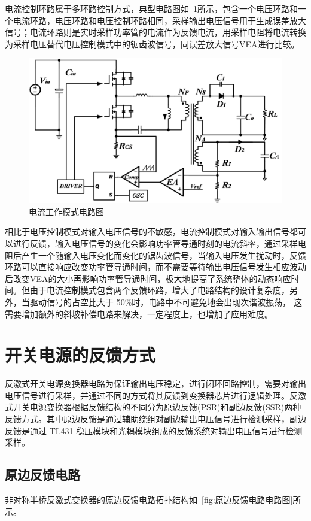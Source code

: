 电流控制环路属于多环路控制方式，典型电路图如~\ref{fig:电流工作模式电路图}所示，包含一个电压环路和一个电流环路，电压环路和电压控制环路相同，采样输出电压信号用于生成误差放大信号；电流环路则是实时采样功率管的电流作为反馈电流，用采样电阻将电流转换为采样电压替代电压控制模式中的锯齿波信号，同误差放大信号VEA进行比较。

\begin{figure}[htbp] 
    \centering
    \includegraphics[width=0.8\linewidth]{figures/电流工作模式电路图.png}
    \caption{电流工作模式电路图}
    \label{fig:电流工作模式电路图}
\end{figure}

相比于电压控制模式对输入电压信号的不敏感，电流控制模式对输入输出信号都可以进行反馈，输入电压信号的变化会影响功率管导通时刻的电流斜率，通过采样电阻后产生一个随输入电压变化而变化的锯齿波信号，当输入电压发生扰动时，反馈环路可以直接响应改变功率管导通时间，而不需要等待输出电压信号发生相应波动后改变VEA的大小再影响功率管导通时间，极大地提高了系统整体的动态响应时间。但由于电流控制模式包含两个反馈环路，增大了电路结构的设计复杂度，另外，当驱动信号的占空比大于 50\%时，电路中不可避免地会出现次谐波振荡， 这需要增加额外的斜坡补偿电路来解决，一定程度上，也增加了应用难度。

 
\section{开关电源的反馈方式}
反激式开关电源变换器电路为保证输出电压稳定，进行闭环回路控制，需要对输出电压信号进行采样，并通过不同的方式将其反馈到变换器芯片进行逻辑处理。反激式开关电源变换器根据反馈结构的不同分为原边反馈(PSR)和副边反馈(SSR)两种反馈方式。其中原边反馈是通过辅助绕组对副边输出电压信号进行检测采样，副边反馈是通过 TL431 稳压模块和光耦模块组成的反馈系统对输出电压信号进行检测采样。

\subsection{原边反馈电路}
非对称半桥反激式变换器的原边反馈电路拓扑结构如~\ref{fig:原边反馈电路电路图}所示。

